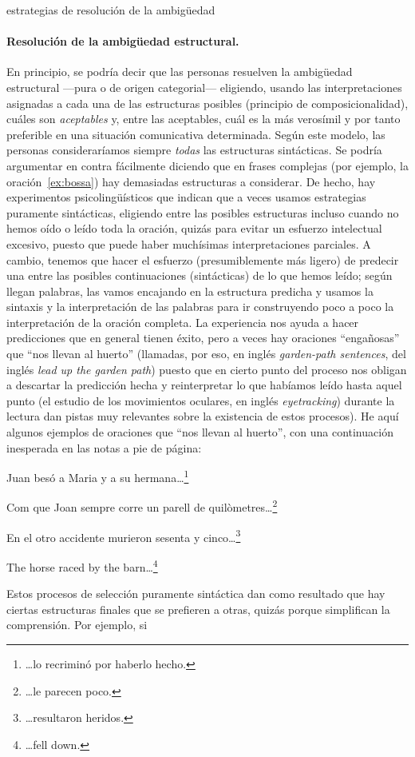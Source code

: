 \begin{persabermes}{estrategias de resolución de la ambigüedad}
\paragraph{Resolución de la ambigüedad estructural.} \label{s3:resambest} En principio, se podría decir que las personas resuelven la ambigüedad estructural ---pura o de origen categorial--- eligiendo, usando las interpretaciones asignadas a cada una de las estructuras posibles (principio de composicionalidad), cuáles son \emph{aceptables} y, entre las aceptables, cuál es la más verosímil y por tanto preferible en una situación comunicativa determinada. Según este modelo, las personas consideraríamos siempre \emph{todas} las estructuras sintácticas. Se podría argumentar en contra fácilmente diciendo que en frases complejas (por ejemplo, la oración~\ref{ex:bossa}) hay demasiadas estructuras a considerar. De hecho, hay experimentos psicolingüísticos que indican que a veces usamos estrategias puramente sintácticas, eligiendo entre las posibles estructuras incluso cuando no hemos oído o leído toda la oración, quizás para evitar un esfuerzo intelectual excesivo, puesto que puede haber muchísimas interpretaciones parciales. A cambio, tenemos que hacer el esfuerzo (presumiblemente más ligero) de predecir una entre las posibles continuaciones (sintácticas) de lo que hemos leído; según llegan palabras, las vamos encajando en la estructura predicha y usamos la sintaxis y la interpretación de las palabras para ir construyendo poco a poco la interpretación de la oración completa. La experiencia nos ayuda a hacer predicciones que en general tienen éxito, pero a veces hay oraciones ``engañosas'' que ``nos llevan al huerto'' (llamadas, por eso, en inglés \emph{garden-path sentences}, del inglés \emph{lead up the garden path}) puesto que en cierto punto del proceso nos obligan a descartar la predicción hecha y reinterpretar lo que habíamos leído hasta aquel punto (el estudio de los movimientos oculares, en inglés \emph{eyetracking}) durante la lectura dan pistas muy relevantes sobre la existencia de estos procesos). He aquí algunos ejemplos de oraciones que ``nos llevan al huerto'', con una continuación inesperada en las notas a pie de página: \begin{exemple} Juan besó a Maria y a su hermana\ldots\footnote{\ldots lo recriminó por haberlo hecho.} \end{exemple} \begin{exemple} Com que Joan sempre corre un parell de quilòmetres\ldots\footnote{\ldots le parecen poco.} \end{exemple} \begin{exemple} En el otro accidente murieron sesenta y cinco\ldots\footnote{\ldots resultaron heridos.} \end{exemple} \begin{exemple} The horse raced by the barn\ldots\footnote{\ldots fell down.} \end{exemple} Estos procesos de selección puramente sintáctica dan como resultado que hay ciertas estructuras finales que se prefieren a otras, quizás porque simplifican la comprensión. Por ejemplo, si 
\end{persabermes}
